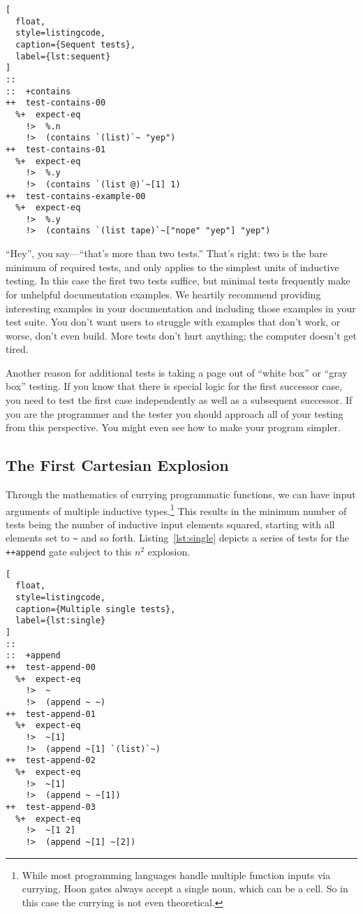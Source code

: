 \documentclass[twoside]{article}
\begin{document}
\begin{lstlisting}[
  float,
  style=listingcode,
  caption={Sequent tests},
  label={lst:sequent}
]
::
::  +contains
++  test-contains-00
  %+  expect-eq
    !>  %.n
    !>  (contains `(list)`~ "yep")
++  test-contains-01
  %+  expect-eq
    !>  %.y
    !>  (contains `(list @)`~[1] 1) 
++  test-contains-example-00
  %+  expect-eq
    !>  %.y
    !>  (contains `(list tape)`~["nope" "yep"] "yep")
\end{lstlisting}

``Hey'', you say—``that's more than two tests.''  That's right:  two is the bare minimum of required tests, and only applies to the simplest units of inductive testing. In this case the first two tests suffice, but minimal tests frequently make for unhelpful documentation examples. We heartily recommend providing interesting examples in your documentation and including those examples in your test suite. You don't want users to struggle with examples that don't work, or worse, don't even build. More tests don't hurt anything; the computer doesn't get tired.

Another reason for additional tests is taking a page out of ``white box'' or ``gray box'' testing. If you know that there is special logic for the first successor case, you need to test the first case independently as well as a subsequent successor. If you are the programmer and the tester you should approach all of your testing from this perspective. You might even see how to make your program simpler.

\subsection{The First Cartesian Explosion}

Through the mathematics of currying programmatic functions, we can have input arguments of multiple inductive types.\footnote{While most programming languages handle multiple function inputs via currying, Hoon gates always accept a single noun, which can be a cell.  So in this case the currying is not even theoretical.}  This results in the minimum number of tests being the number of inductive input elements squared, starting with all elements set to \lstinline[style=inlinecode]{~} and so forth.  Listing~\ref{lst:single} depicts a series of tests for the \texttt{++append} gate subject to this $n^2$ explosion.

\begin{lstlisting}[
  float,
  style=listingcode,
  caption={Multiple single tests},
  label={lst:single}
]
::
::  +append
++  test-append-00
  %+  expect-eq
    !>  ~
    !>  (append ~ ~)
++  test-append-01
  %+  expect-eq
    !>  ~[1]
    !>  (append ~[1] `(list)`~)
++  test-append-02
  %+  expect-eq
    !>  ~[1]
    !>  (append ~ ~[1])
++  test-append-03
  %+  expect-eq
    !>  ~[1 2]
    !>  (append ~[1] ~[2])
\end{lstlisting}
\end{document}
